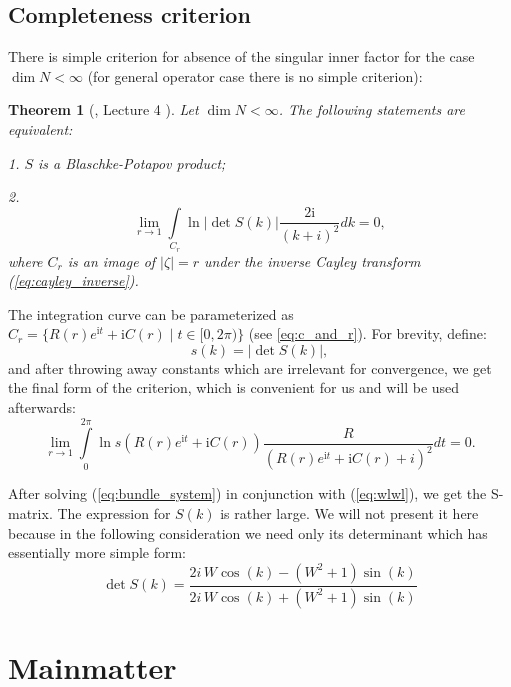\documentclass{birkjour}
\newtheorem{thm}{Theorem}[section]
\theoremstyle{definition}
\theoremstyle{remark}
\numberwithin{equation}{section}
\begin{document}
\subsection{Completeness criterion}
There is simple criterion for absence of the singular inner factor
for the case  $\dim  N < \infty$ (for general operator case there
is no simple criterion):

\begin{thm}[\cite{Nik}, Lecture 4 ] Let $\dim  N < \infty$. The following
statements are equivalent:

1.  $S$ is a Blaschke-Potapov  product;

2. \begin{equation}\label{eq:crit} \lim\limits_{r \to 1}
\int\limits_{C_r} \ln \left|\det S(k)\right| \frac{2
\mathrm{i}}{(k + i)^2} dk = 0,
\end{equation}
where $C_r$ is an image of $\left|\zeta\right| = r$ under the
inverse Cayley transform (\ref{eq:cayley_inverse}).
\end{thm}

The integration curve can be parameterized as $C_r = \{R(r)
e^{\mathrm{i} t} + \mathrm{i} C(r) \mid t \in [0, 2 \pi)\}$ (see
\ref{eq:c_and_r}). For brevity, define:
\[
s(k) = \left|\det S(k)\right|,
\]
and after throwing away constants which are irrelevant for
convergence, we get the final form of the criterion, which is
convenient for us and will be used afterwards:
\begin{equation}\label{eq:critp}
\lim\limits_{r \to 1} \int\limits_{0}^{2 \pi} \ln s(R(r)
e^{\mathrm{i} t} + \mathrm{i} C(r)) \frac{R}{(R(r) e^{\mathrm{i}
t} + \mathrm{i} C(r) + i)^2} dt = 0.
\end{equation}

After solving (\ref{eq:bundle_system}) in conjunction with
(\ref{eq:wlwl}), we get the S-matrix. The expression for $S(k)$ is
rather large. We will not present it here because in the following
consideration we need only its determinant which has essentially
more simple form:
\begin{equation}\label{det-s}
\det S(k) = \frac{2 i \, W \cos\left(k\right) -
{\left(W^{2} + 1\right)} \sin\left(k\right)}{2 i \,
W \cos\left(k\right) + {\left(W^{2} + 1\right)} \sin\left(k\right)}
\end{equation}




\section{Mainmatter}
\end{document}
